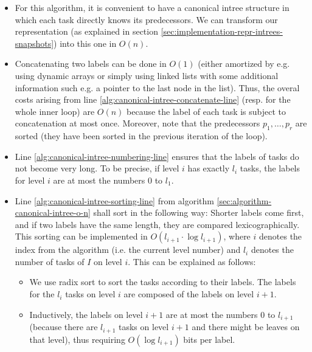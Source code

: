 \begin{itemize}
\item For this algorithm, it is convenient to have a canonical intree structure in which each task directly knows its predecessors. We can transform our representation (as explained in section \ref{sec:implementation-repr-intrees-snapshots}) into this one in $O(n)$.
\item Concatenating two labels can be done in $O(1)$ (either amortized by e.g. using dynamic arrays or simply using linked lists with some additional information such e.g. a pointer to the last node in the list). Thus, the overal costs arising from line \ref{alg:canonical-intree-concatenate-line} (resp. for the whole inner loop) are $O(n)$ because the label of each task is subject to concatenation at most once. Moreover, note that the predecessors $p_1,\dots,p_r$ are sorted (they have been sorted in the previous iteration of the loop).
\item Line \ref{alg:canonical-intree-numbering-line} ensures that the labels of tasks do not become very long. To be precise, if level $i$ has exactly $l_i$ tasks, the labels for level $i$ are at most the numbers 0 to $l_1$.
\item Line \ref{alg:canonical-intree-sorting-line} from algorithm \ref{sec:algorithm-canonical-intree-o-n} shall sort in the following way: Shorter labels come first, and if two labels have the same length, they are compared lexicographically. This sorting can be implemented in $O(l_{i+1}\cdot\log l_{i+1})$, where $i$ denotes the index from the algorithm (i.e. the current level number) and $l_i$ denotes the number of tasks of $I$ on level $i$. This can be explained as follows:
  \begin{itemize}
  \item We use radix sort to sort the tasks according to their labels. The labels for the $l_i$ tasks on level $i$ are composed of the labels on level $i+1$.
  \item Inductively, the labels on level $i+1$ are at most the numbers 0 to $l_{i+1}$ (because there are $l_{i+1}$ tasks on level $i+1$ and there might be leaves on that level), thus requiring $O(\log l_{i+1})$ bits per label.

\end{itemize}
\end{itemize}
